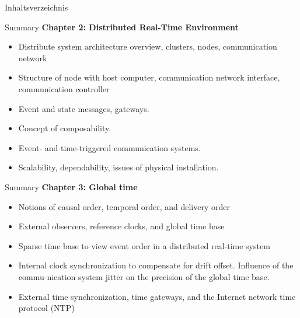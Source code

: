 






\begin{frame}
  \titlepage
\end{frame}

\begin{frame}{Inhaltsverzeichnis}
  \tableofcontents
\end{frame}


\begin{frame}{Summary} 
\textbf{Chapter 2: Distributed Real-Time Environment}
\begin{itemize}
	\item Distribute system architecture overview, clusters, nodes, communication
  network
 	\item Structure of node with host computer, communication network interface,
  communication controller
	\item	Event and state messages, gateways. 
	\item	Concept of composability. 
	\item	Event- and time-triggered communication systems. 
	\item	Scalability, dependability, issues of physical installation.
\end{itemize}
\end{frame}

\begin{frame}{Summary}
\textbf{Chapter 3: Global time}
\begin{itemize}
\item Notions of causal order, temporal order, and delivery order
\item External observers, reference clocks, and global time base
\item Sparse time base to view event order in a distributed real-time system
\item Internal clock synchronization to compensate for drift offset. Influence of the commu-nication system jitter on the precision of the global time base.
\item External time synchronization, time gateways, and the Internet network time protocol (NTP)
\end{itemize}
\end{frame}

